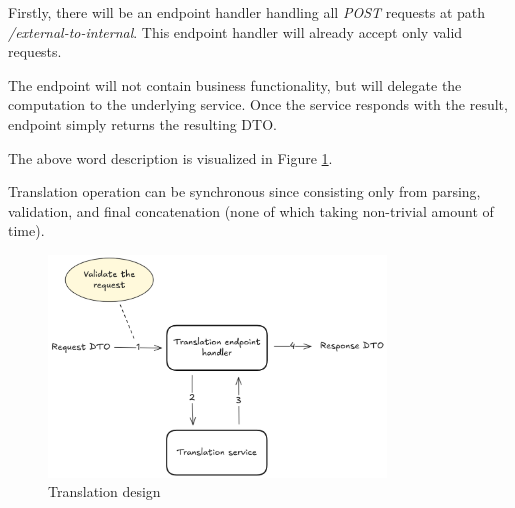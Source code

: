 \documentclass[../main.tex]{subfiles}
\begin{document}
Firstly, there will be an endpoint handler handling all \textit{POST} requests at path \textit{/external-to-internal}. This endpoint handler will already accept only valid requests.

The endpoint will not contain business functionality, but will delegate the computation to the underlying service. Once the service responds with the result, endpoint simply returns the resulting DTO.

The above word description is visualized in Figure \ref{fig:translation-design}.

Translation operation can be synchronous since consisting only from parsing, validation, and final concatenation (none of which taking non-trivial amount of time).

\begin{figure}
  \begin{center}
    \includegraphics[width=0.8\textwidth]{images/translation-design.png}
  \end{center}
  \caption{Translation design}
  \label{fig:translation-design}
\end{figure}
\end{document}
